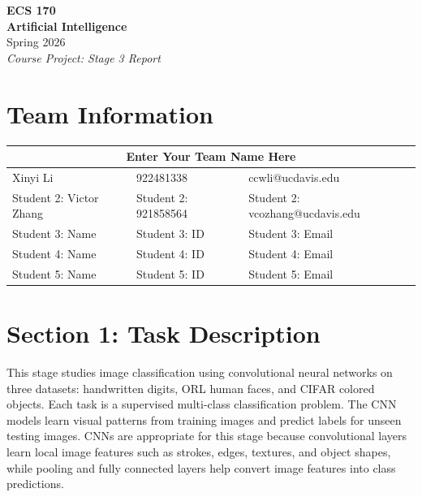 \documentclass[10pt]{article}
\begin{document}
\begin{center}
    {\Large \textbf{\textcolor{blue!60!black}{ECS 170}}}\\
    \vspace{4pt}
    {\Large \textbf{\textcolor{blue!60!black}{Artificial Intelligence}}}\\
    \vspace{4pt}
    Spring 2026\\
    \vspace{6pt}
    \textit{Course Project: Stage 3 Report}
\end{center}

\section*{Team Information}

\begin{table}[H]
\centering
\renewcommand{\arraystretch}{1.10}
\begin{tabular}{|p{}|p{}|p{}|}
\hline
\multicolumn{3}{|c|}{\textbf{Enter Your Team Name Here}} \\
\hline
Xinyi Li & 922481338 & ccwli@ucdavis.edu \\
\hline
Student 2: Victor Zhang& Student 2: 921858564& Student 2: vcozhang@ucdavis.edu\\
\hline
Student 3: Name & Student 3: ID & Student 3: Email \\
\hline
Student 4: Name & Student 4: ID & Student 4: Email \\
\hline
Student 5: Name & Student 5: ID & Student 5: Email \\
\hline
\end{tabular}
\end{table}

\section*{Section 1: Task Description}

This stage studies image classification using convolutional neural networks on three datasets: handwritten digits, ORL human faces, and CIFAR colored objects. Each task is a supervised multi-class classification problem. The CNN models learn visual patterns from training images and predict labels for unseen testing images. CNNs are appropriate for this stage because convolutional layers learn local image features such as strokes, edges, textures, and object shapes, while pooling and fully connected layers help convert image features into class predictions. 
\end{document}
